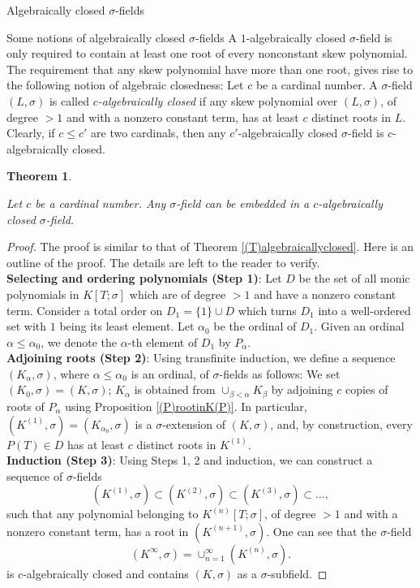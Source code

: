 \documentclass[11pt,a4paper]{article}
\theoremstyle{theorem}
\newtheorem{theorem}{Theorem}[section]
\numberwithin{equation}{section}
\newcommand{\s}{\sigma}
\begin{document}
\begin{section}{Algebraically closed $\s$-fields}
\begin{subsection}{Some notions of algebraically closed $\s$-fields}
		A $1$-algebraically closed $\s$-field is only required to contain at least one root of every nonconstant skew polynomial. The requirement that any skew polynomial have more than one root, gives rise to the following notion of algebraic closedness: Let $c$ be a cardinal number. A $\s$-field $(L,\s)$ is called \textit{$c$-algebraically closed} if any skew polynomial over $(L,\s)$, of degree $>1$ and with a nonzero constant term, has at least $c$ distinct roots in $L$.  Clearly, if $c\leq c'$ are two cardinals, then any $c'$-algebraically closed $\s$-field is $c$-algebraically closed.

			
	\begin{theorem}\label{(T)$c$-algebraically closed}
	
	Let $c$ be a cardinal number. Any $\s$-field can be embedded in a $c$-algebraically closed $\s$-field. 
	
	\end{theorem}

		
	\begin{proof}
		The proof is similar to that of Theorem \ref{(T)algebraicallyclosed}. Here is an outline of the proof. The details are left to the reader to verify.\\   
		\textbf{Selecting and ordering polynomials (Step 1)}:  Let $D$  be the set of all monic polynomials in $K[T;\s]$ which are of degree $>1$ and have a nonzero constant term. 
		Consider a total order on $D_1=\{1\}\cup D$ which turns $D_1$ into a well-ordered set with $1$ being its least element. Let $\alpha_0$ be the ordinal of $D_1$. Given an ordinal $\alpha\leq \alpha_0$, we denote the $\alpha$-th element of $D_1$ by $P_\alpha$. \\ 
		\textbf{Adjoining roots (Step 2)}: 
		Using transfinite induction, we define a sequence $(K_\alpha,\s)$, where $\alpha\leq \alpha_0$ is an ordinal, of $\s$-fields as follows: We set$(K_0,\s)=(K,\s)$; $K_\alpha$ is obtained from $\cup_{\beta<\alpha}K_\beta$ by adjoining $c$ copies of roots of $P_\alpha$ using  Proposition \ref{(P)rootinK(P)}. In particular,
        $(K^{(1)},\s)=(K_{\alpha_0},\s)$ is  a $\s$-extension of $(K,\s)$, and,  by construction, every $P(T)\in D$ has at least $c$ distinct roots in $K^{(1)}$. \\
		\textbf{Induction (Step 3)}: 
		Using Steps 1, 2  and induction, we can construct a  sequence of $\s$-fields
		$$(K^{(1)},\s)\subset (K^{(2)},\s)\subset (K^{(3)},\s)\subset \dots,$$
		such that  any polynomial belonging to  $K^{(n)}[T;\s]$, of degree $>1$ and with a nonzero constant term, has a root in  $(K^{(n+1)},\s)$. One can see that the $\s$-field
		$$(K^{\infty},\s)=\cup_{n=1}^\infty (K^{(n)},\s).$$
		 is $c$-algebraically closed and contains $(K,\s) $ as a $\s$-subfield. 
	\end{proof}	
	


\end{subsection}
\end{section}
\end{document}
